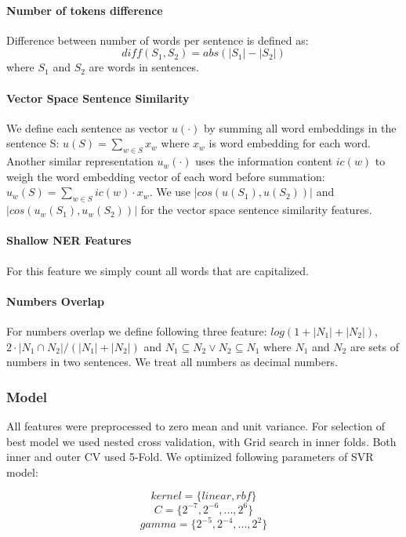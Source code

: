 \documentclass[10pt, a4paper]{article}
\begin{document}
\begin{table}[h!]
\paragraph{Number of tokens difference \\}
Difference between number of words per sentence is defined as:
\begin{equation}\label{eq:word-diff}
diff(S_1, S_2) = abs(|S_1| - |S_2|)
\end{equation}
where $S_1$ and $S_2$ are words in sentences.
\paragraph{Vector Space Sentence Similarity \\}
We define each sentence as vector $u(\cdot)$ by summing all word embeddings in the sentence S: $ u(S) = \sum_{w \in S} x_w$ where $x_w$ is word embedding for each word. Another similar
representation $u_w(\cdot)$ uses the information content
$ic(w)$ to weigh the word embedding vector of each word
before summation: $u_w(S) = \sum_{w \in S} ic(w) \cdot x_w.$
We use $|cos(u(S_1), u(S_2))|$ and $|cos(u_w(S_1), u_w(S_2))|$ for the vector space sentence similarity features. \citep{Saric2012TakeLabSF}
\paragraph{Shallow NER Features \\}
For this feature we simply count all words that are capitalized.
\paragraph{Numbers Overlap \\}
For numbers overlap we define following three feature: $log(1+|N_1|+|N_2|)$, $2\cdot|N_1 \cap N_2|/(|N_1|+|N_2|)$ and $N_1 \subseteq N_2 \vee N_2 \subseteq N_1$
where $N_1$ and $N_2$ are sets of numbers in two sentences. We treat all numbers as decimal numbers.

\subsubsection{Model}
All features were preprocessed to zero mean and unit variance. For selection of best model we used nested cross validation, with Grid search in inner folds. Both inner and outer CV used 5-Fold. We optimized following parameters of SVR model:

\[ kernel = \{ linear, rbf \} \]
\[ C = \{ 2^{-7},2^{-6}, ..., 2^6 \} \]
\[ gamma = \{ 2^{-5}, 2^{-4},..., 2^2 \} \]


\end{table}
\end{document}
